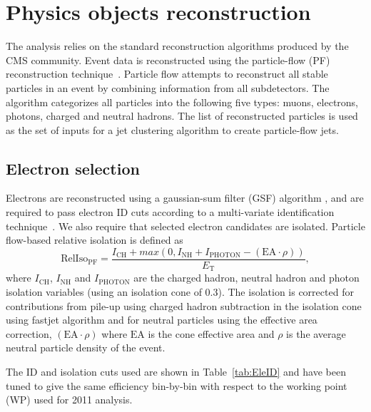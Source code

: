 \clearpage{}
\section{Physics objects reconstruction}
\label{sec:reco}
\label{sec:firstStep}
The analysis relies on the standard reconstruction algorithms 
produced by the CMS community.
Event data is reconstructed using the particle-flow (PF) reconstruction 
technique~\cite{pflow}. 
Particle flow attempts to reconstruct all stable particles in an event by 
combining information from all subdetectors. The algorithm categorizes all 
particles into the following five types: muons, electrons, photons, charged 
and neutral hadrons. The list of reconstructed particles is used as the set of
inputs for a jet clustering algorithm to create particle-flow jets.
\subsection{Electron selection}
\label{sec:electron_cuts}

Electrons are reconstructed using a gaussian-sum filter (GSF)
algorithm \cite{CMS-PAS-EGM-10-004}, and are required to pass electron
ID cuts according to a multi-variate identification
technique~\cite{cite:elemva}.  We also require that selected
electron candidates are isolated. Particle flow-based relative
isolation is defined as
\begin{equation*}
\mathrm{RelIso_{\mathrm{PF}}} = \frac{I_{\mathrm{CH}}+max(0,I_{\mathrm{NH}}+I_{\mathrm{PHOTON}}-(\mathrm{EA}\cdot\rho))}{E_\mathrm{T}},
\end{equation*}
where $I_{\mathrm{CH}}$, $I_{\mathrm{NH}}$ and $I_{\mathrm{PHOTON}}$
are the charged hadron, neutral hadron and photon isolation variables
(using an isolation cone of 0.3). The isolation is corrected for
contributions from pile-up using charged hadron subtraction in the
isolation cone using fastjet algorithm \cite{FastJetPUSubtraction} and
for neutral particles using the effective area correction,
$(\mathrm{EA}\cdot\rho)$ where $\mathrm{EA}$ is the cone effective area
and $\rho$ is the average neutral particle density of the event.

The ID and isolation cuts used are shown in Table~\ref{tab:EleID} and
have been tuned to give the same efficiency bin-by-bin with respect to
the working point (WP) used for 2011 analysis.

